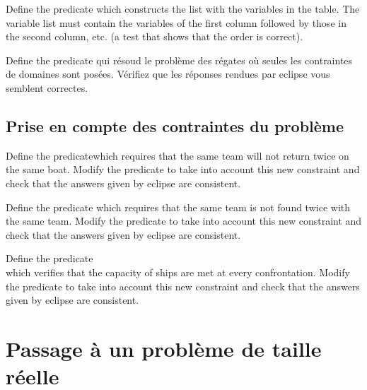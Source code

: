 \begin{question}
  Define the predicate  which constructs the
  list  with the variables in the table. The variable list must contain the variables of the first column followed by those in the second column, etc. (a test that shows that the order is correct).
  \end{question}

\begin{question}
 Define the predicate   qui résoud le problème des régates où seules les contraintes de domaines sont posées. 
Vérifiez que les réponses rendues par eclipse vous semblent correctes. 
\end{question}

\subsection{Prise en compte des contraintes du problème}

\begin{question}
 Define the predicatewhich requires that the same team will not return twice on the same boat.
Modify the predicate  to take into account this new constraint and check that the answers given by eclipse are consistent.\end{question}

\begin{question}
 Define the predicate which requires that the same team is not found twice with the same team.
Modify the predicate  to take into account this new constraint and check that the answers given by eclipse are consistent.
\end{question}

\begin{question}
 Define the predicate \\  which verifies that the capacity of ships are met at every confrontation.
Modify the predicate  to take into account this new constraint and check that the answers given by eclipse are consistent.\end{question}

\section{Passage à un problème de taille réelle}

